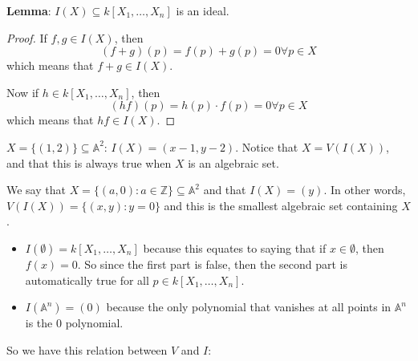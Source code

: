 \documentclass{report}
\begin{document}
\textbf{Lemma}: $I(X) \subseteq k[X_{1}, \ldots, X_{n}]$ is an ideal.
    \begin{proof}
        If $f, g \in I(X)$, then 
            \begin{equation*}
                (f + g)(p) = f(p) + g(p) = 0 \forall p \in X
            \end{equation*}
        which means that $f + g \in I(X)$.

        Now if $h \in k[X_{1}, \ldots, X_{n}]$, then 
            \begin{equation*}
                (hf)(p) = h(p) \cdot f(p) = 0 \forall p \in X
            \end{equation*}
        which means that $hf \in I(X)$.
    \end{proof}

\begin{examples}
    \begin{example}
        $X = \{(1, 2)\} \subseteq \mathbb{A}^{2}$: $I(X) = (x - 1, y - 2)$. Notice that $X = V(I(X))$, and that this is always true when $X$ is an algebraic set. 
    \end{example}
    \begin{example}
        We say that $X = \{(a, 0) :  a\in \mathbb{Z}\} \subseteq \mathbb{A}^{2}$ and that $I(X) = (y)$. In other words, $V(I(X)) = \{(x, y) : y = 0\}$ and this is the smallest algebraic set containing $X$.
    \end{example}
    \begin{example}
        \begin{itemize}
            \item $I(\emptyset) = k[X_{1}, \ldots, X_{n}]$ because this equates to saying that if $x \in \emptyset$, then $f(x) = 0$. So since the first part is false, then the second part is automatically true for all $p \in k[X_{1}, \ldots, X_{n}]$.  

            \item $I(\mathbb{A}^{n}) = (0)$ because the only polynomial that vanishes at all points in $\mathbb{A}^{n}$ is the $0$ polynomial.  
        \end{itemize}
    \end{example}
\end{examples}
So we have this relation between $V$ and $I$:
    \begin{center}
    \end{center}
\end{document}
